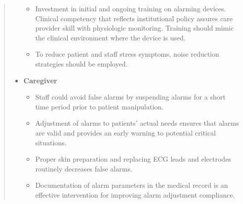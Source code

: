 \begin{quotation}
\begin{itemize}
\begin{itemize}
			\item Investment in initial and ongoing training on alarming devices. Clinical competency that reflects institutional policy assures care provider skill with physiologic monitoring. Training should mimic the clinical environment where the device is used.
			\item To reduce patient and staff stress symptoms, noise reduction strategies should be employed.
		\end{itemize}
		\item \textbf{Caregiver}
		\begin{itemize}
			\item Staff could avoid false alarms by suspending alarms for a short time period prior to patient manipulation.
			\item Adjustment of alarms to patients' actual needs ensures that alarms are valid and provides an early warning to potential critical situations.
			\item Proper skin preparation and replacing ECG leads and electrodes routinely decreases false alarms.
			\item Documentation of alarm parameters in the medical record is an effective intervention for improving alarm adjustment compliance.
		\end{itemize}
	\end{itemize}
\end{quotation}